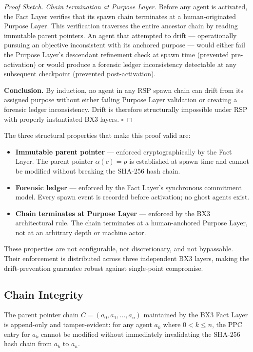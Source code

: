 \begin{proof}[Proof Sketch]
\textit{Chain termination at Purpose Layer.} Before any agent is activated, the Fact Layer verifies that its spawn chain terminates at a human-originated Purpose Layer. This verification traverses the entire ancestor chain by reading immutable parent pointers. An agent that attempted to drift — operationally pursuing an objective inconsistent with its anchored purpose — would either fail the Purpose Layer's descendant refinement check at spawn time (prevented pre-activation) or would produce a forensic ledger inconsistency detectable at any subsequent checkpoint (prevented post-activation).

\medskip
\noindent\textbf{Conclusion.} By induction, no agent in any RSP spawn chain can drift from its assigned purpose without either failing Purpose Layer validation or creating a forensic ledger inconsistency. Drift is therefore structurally impossible under RSP with properly instantiated BX3 layers. $\square$
\end{proof}

The three structural properties that make this proof valid are:

\begin{itemize}
  \item \textbf{Immutable parent pointer} — enforced cryptographically by the Fact Layer. The parent pointer $\alpha(c) = p$ is established at spawn time and cannot be modified without breaking the SHA-256 hash chain.
  \item \textbf{Forensic ledger} — enforced by the Fact Layer's synchronous commitment model. Every spawn event is recorded before activation; no ghost agents exist.
  \item \textbf{Chain terminates at Purpose Layer} — enforced by the BX3 architectural rule. The chain terminates at a human-anchored Purpose Layer, not at an arbitrary depth or machine actor.
\end{itemize}

These properties are not configurable, not discretionary, and not bypassable. Their enforcement is distributed across three independent BX3 layers, making the drift-prevention guarantee robust against single-point compromise.

\subsection{Chain Integrity}

\begin{property}\label{prop:chain-integrity}
The parent pointer chain $C = (a_0, a_1, \ldots, a_n)$ maintained by the BX3 Fact Layer is append-only and tamper-evident: for any agent $a_k$ where $0 < k \leq n$, the PPC entry for $a_k$ cannot be modified without immediately invalidating the SHA-256 hash chain from $a_k$ to $a_n$.
\end{property}

